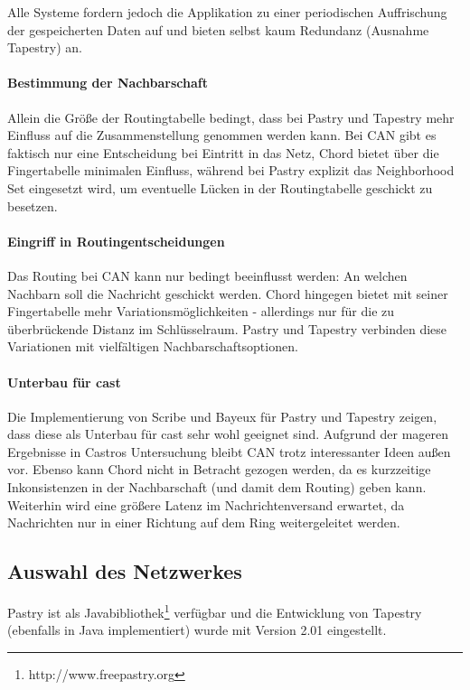 Alle Systeme fordern jedoch die Applikation zu einer periodischen Auffrischung der gespeicherten Daten auf und bieten selbst kaum Redundanz (Ausnahme Tapestry) an.


\paragraph{Bestimmung der Nachbarschaft}
Allein die Größe der Routingtabelle bedingt, dass bei Pastry und Tapestry mehr Einfluss auf die Zusammenstellung genommen werden kann. Bei CAN gibt es faktisch nur eine Entscheidung bei Eintritt in das Netz, Chord bietet über die Fingertabelle minimalen Einfluss, während bei Pastry explizit das Neighborhood Set eingesetzt wird, um eventuelle Lücken in der Routingtabelle geschickt zu besetzen.

\paragraph{Eingriff in Routingentscheidungen}
Das Routing bei CAN kann nur bedingt beeinflusst werden: An welchen Nachbarn soll die Nachricht geschickt werden. Chord hingegen bietet mit seiner Fingertabelle mehr Variationsmöglichkeiten - allerdings nur für die zu überbrückende Distanz im Schlüsselraum. Pastry und Tapestry verbinden diese Variationen mit vielfältigen Nachbarschaftsoptionen.

\paragraph{Unterbau für \ac{cast}}
Die Implementierung von Scribe und Bayeux für Pastry und Tapestry zeigen, dass diese als Unterbau für \ac{cast} sehr wohl geeignet sind. Aufgrund der mageren Ergebnisse in Castros Untersuchung \cite{Castro2003Evaluation} bleibt CAN trotz interessanter Ideen außen vor. Ebenso kann Chord nicht in Betracht gezogen werden, da es kurzzeitige Inkonsistenzen in der Nachbarschaft (und damit dem Routing) geben kann. Weiterhin wird eine größere Latenz im Nachrichtenversand erwartet, da Nachrichten nur in einer Richtung auf dem Ring weitergeleitet werden.


\subsection*{Auswahl des Netzwerkes}
Pastry ist als Javabibliothek\footnote{http://www.freepastry.org} verfügbar und die Entwicklung von Tapestry (ebenfalls in Java implementiert) wurde mit Version 2.01 eingestellt.

